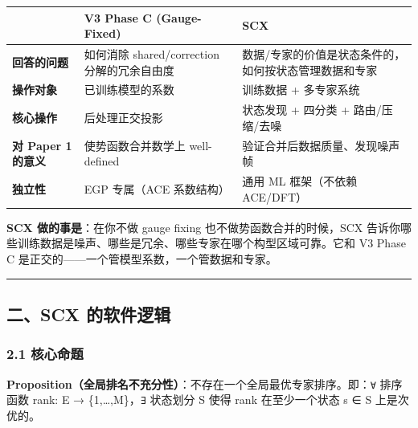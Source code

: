 \documentclass[
  12pt,
]{ctexart}
\begin{document}
\begin{longtable}[]{@{}
  >{\raggedright\arraybackslash}p{}
  >{\raggedright\arraybackslash}p{}
  >{\raggedright\arraybackslash}p{}@{}}
\toprule\noalign{}
\begin{minipage}[b]{\linewidth}\raggedright
\end{minipage} & \begin{minipage}[b]{\linewidth}\raggedright
V3 Phase C (Gauge-Fixed)
\end{minipage} & \begin{minipage}[b]{\linewidth}\raggedright
SCX
\end{minipage} \\
\midrule\noalign{}
\endhead
\bottomrule\noalign{}
\endlastfoot
\textbf{回答的问题} & 如何消除 shared/correction 分解的冗余自由度 &
数据/专家的价值是状态条件的，如何按状态管理数据和专家 \\
\textbf{操作对象} & 已训练模型的系数 & 训练数据 + 多专家系统 \\
\textbf{核心操作} & 后处理正交投影 & 状态发现 + 四分类 +
路由/压缩/去噪 \\
\textbf{对 Paper 1 的意义} & 使势函数合并数学上 well-defined &
验证合并后数据质量、发现噪声帧 \\
\textbf{独立性} & EGP 专属（ACE 系数结构） & 通用 ML 框架（不依赖
ACE/DFT） \\
\end{longtable}

\textbf{SCX 做的事是}：在你不做 gauge fixing 也不做势函数合并的时候，SCX
告诉你哪些训练数据是噪声、哪些是冗余、哪些专家在哪个构型区域可靠。它和
V3 Phase C 是正交的------一个管模型系数，一个管数据和专家。

\begin{center}\rule{0.5\linewidth}{0.5pt}\end{center}

\subsection{二、SCX
的软件逻辑}\label{ux4e8cscx-ux7684ux8f6fux4ef6ux903bux8f91}

\subsubsection{2.1 核心命题}\label{ux6838ux5fc3ux547dux9898}

\textbf{Proposition（全局排名不充分性）}：不存在一个全局最优专家排序。即：\texttt{∀}
排序函数 rank: E → \{1,\ldots,M\}，\texttt{∃} 状态划分 S 使得 rank
在至少一个状态 s ∈ S 上是次优的。
\end{document}
